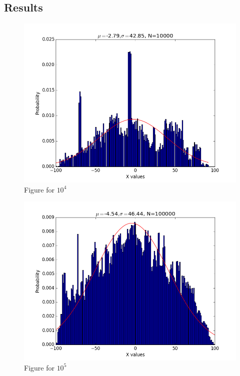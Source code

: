\documentclass[]{article}
\begin{document}
        \subsection{Results}
            \begin{figure}[H]
                \centering
                \includegraphics[scale=0.5]{P6_1E4.png}
                \caption{Figure for $10^4$}
            \end{figure}
            \begin{figure}[H]
                \centering
                \includegraphics[scale=0.5]{P6_1E5.png}
                \caption{Figure for $10^5$}
            \end{figure}
\end{document}
